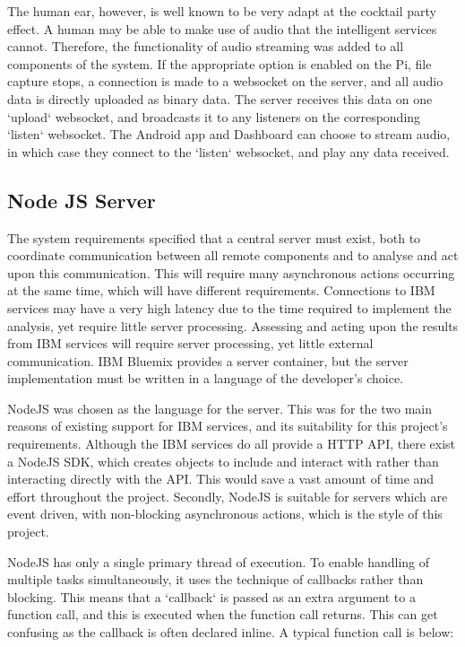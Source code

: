 \documentclass{article}
\begin{document}
The human ear, however, is well known to be very adapt at the cocktail party effect\cite{cocktailParty}. A human may be able to make use of audio that the intelligent services cannot. Therefore, the functionality of audio streaming was added to all components of the system. If the appropriate option is enabled on the Pi, file capture stops, a connection is made to a websocket on the server, and all audio data is directly uploaded as binary data. The server receives this data on one `upload` websocket, and broadcasts it to any listeners on the corresponding `listen` websocket. The Android app and Dashboard can choose to stream audio, in which case they connect to the `listen` websocket, and play any data received.

\subsection{Node JS Server}
The system requirements specified that a central server must exist, both to coordinate communication between all remote components and to analyse and act upon this communication. This will require many asynchronous actions occurring at the same time, which will have different requirements. Connections to IBM services may have a very high latency due to the time required to implement the analysis, yet require little server processing. Assessing and acting upon the results from IBM services will require server processing, yet little external communication. IBM Bluemix provides a server container, but the server implementation must be written in a language of the developer's choice. 

NodeJS was chosen as the language for the server. This was for the two main reasons of existing support for IBM services, and its suitability for this project's requirements. Although the IBM services do all provide a HTTP API, there exist a NodeJS SDK, which creates objects to include and interact with rather than interacting directly with the API\cite{githubWatsonCloud}\cite{githubCloudant}\cite{githubDB2}. This would save a vast amount of time and effort throughout the project. Secondly, NodeJS is suitable for servers which are event driven, with non-blocking asynchronous actions\cite{smackdownPHPNodejs}, which is the style of this project.

NodeJS has only a single primary thread of execution. To enable handling of multiple tasks simultaneously, it uses the technique of callbacks rather than blocking. This means that a `callback` is passed as an extra argument to a function call, and this is executed when the function call returns. This can get confusing as the callback is often declared inline. A typical function call is below:
\end{document}

